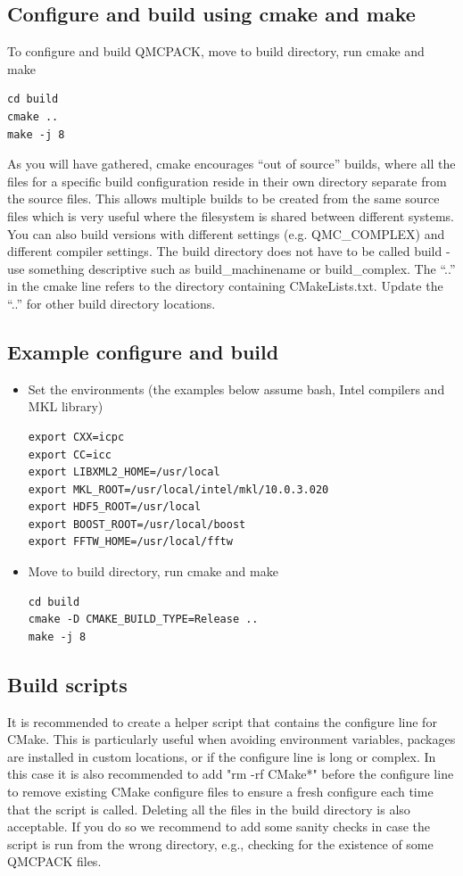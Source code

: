 \subsection{Configure and build using cmake and make}
To configure and build QMCPACK, move to build directory, run cmake and make
\verbatimfont{\footnotesize}
\begin{verbatim}
cd build
cmake ..
make -j 8
\end{verbatim}

As you will have gathered, cmake encourages ``out of source'' builds,
where all the files for a specific build configuration reside in their
own directory separate from the source files. This allows multiple
builds to be created from the same source files which is very useful
where the filesystem is shared between different systems. You can also
build versions with different settings (e.g. QMC\_COMPLEX) and
different compiler settings. The build directory does not have to be
called build - use something descriptive such as build\_machinename or
build\_complex. The ``..'' in the cmake line refers to the directory
containing CMakeLists.txt. Update the ``..'' for other build
directory locations.

\subsection{Example configure and build}
\begin{itemize}
\item Set the environments (the examples below assume bash, Intel compilers and MKL library)
\verbatimfont{\footnotesize}
\begin{verbatim}
export CXX=icpc
export CC=icc
export LIBXML2_HOME=/usr/local
export MKL_ROOT=/usr/local/intel/mkl/10.0.3.020
export HDF5_ROOT=/usr/local
export BOOST_ROOT=/usr/local/boost
export FFTW_HOME=/usr/local/fftw
\end{verbatim}

\item Move to build directory, run cmake and make
\verbatimfont{\footnotesize}
\begin{verbatim}
cd build
cmake -D CMAKE_BUILD_TYPE=Release ..
make -j 8
\end{verbatim}
\end{itemize}

\subsection{Build scripts}
It is recommended to create a helper script that contains the
configure line for CMake.  This is particularly useful when avoiding
environment variables, packages are installed in custom locations,
or if the configure line is long or complex.  In this case it is also
recommended to add "rm -rf CMake*" before the configure line to remove
existing CMake configure files to ensure a fresh configure each time
that the script is called. Deleting all the files in the build
directory is also acceptable. If you do so we recommend to add some sanity
checks in case the script is run from the wrong directory, e.g.,
checking for the existence of some QMCPACK files.

